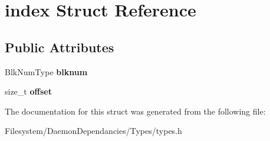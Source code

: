\hypertarget{structindex}{}\section{index Struct Reference}
\label{structindex}
\subsection*{Public Attributes}
\begin{DoxyCompactItemize}
\item 
\mbox{\label{structindex_a4601f529cd0b66a29506c272687be78d}} 
Blk\+Num\+Type {\bfseries blknum}
\item 
\mbox{\label{structindex_a5ebe7af77c7d366b339d77f992078e11}} 
size\+\_\+t {\bfseries offset}
\end{DoxyCompactItemize}


The documentation for this struct was generated from the following file\+:\begin{DoxyCompactItemize}
\item 
Filesystem/\+Daemon\+Dependancies/\+Types/types.\+h\end{DoxyCompactItemize}

